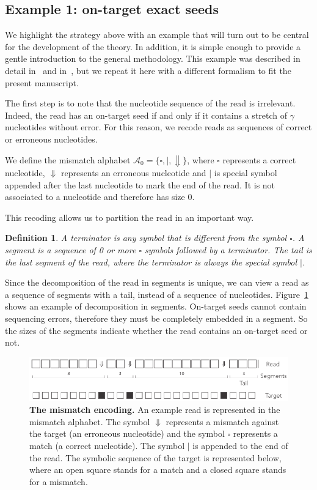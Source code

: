 \documentclass{article}
\newtheorem{definition}{Definition}
\begin{document}
\subsection{Example 1: on-target exact seeds}
\label{sec:example_exact}

We highlight the strategy above with an example that will turn out to be
central for the development of the theory. In addition, it is simple
enough to provide a gentle introduction to the general methodology. This
example was described in detail in~\cite{filion2017analytic} and
in~\cite{filion2018analytic}, but we repeat it here with a different
formalism to fit the present manuscript.

The first step is to note that the nucleotide sequence of the read is
irrelevant. Indeed, the read has an on-target seed if and only if it
contains a stretch of $\gamma$ nucleotides without error. For this reason,
we recode reads as sequences of correct or erroneous nucleotides.

We define the mismatch alphabet $\mathcal{A}_0 = \{\square, |,
\Downarrow\}$, where $\square$ represents a correct nucleotide,
$\Downarrow$ represents an erroneous nucleotide and $|$ is special symbol
appended after the last nucleotide to mark the end of the read. It is not
associated to a nucleotide and therefore has size 0.

This recoding allows us to partition the read in an important way.

\begin{definition}
\label{def:seg}
A terminator is any symbol that is different from the symbol $\square$. A
segment is a sequence of 0 or more $\square$ symbols followed by a
terminator. The tail is the last segment of the read, where the terminator
is always the special symbol $|$.
\end{definition}

Since the decomposition of the read in segments is unique, we can view a
read as a sequence of segments with a tail, instead of a sequence of
nucleotides. Figure~\ref{fig:simple} shows an example of decomposition in
segments. On-target seeds cannot contain sequencing errors, therefore they
must be completely embedded in a segment. So the sizes of the segments
indicate whether the read contains an on-target seed or not.

\begin{figure}[h]
\centering
\includegraphics[scale=0.85]{sketch_simple.pdf}
\caption{\textbf{The mismatch encoding.}
An example read is represented in the mismatch alphabet. The symbol
$\Downarrow$ represents a mismatch against the target (an erroneous
nucleotide) and the symbol $\square$ represents a match (a correct
nucleotide). The symbol $|$ is appended to the end of the read. The
symbolic sequence of the target is represented below, where an open square
stands for a match and a closed square stands for a mismatch.}
\label{fig:simple}
\end{figure}
\end{document}
